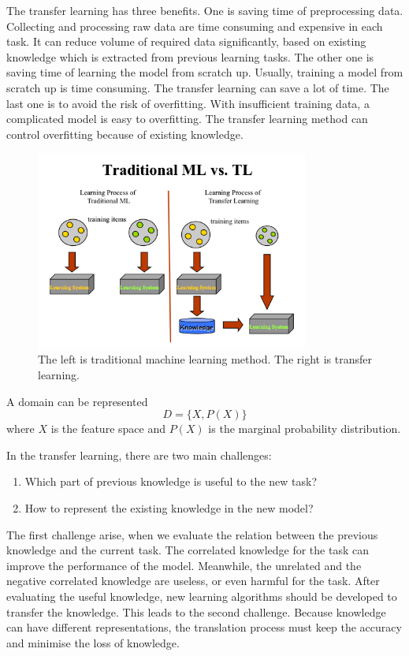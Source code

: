 The transfer learning has three benefits. One is saving time of preprocessing data. Collecting and processing raw data are time consuming and expensive in each task. It can reduce volume of required data significantly, based on existing knowledge which is extracted from previous learning tasks. The other one is saving time of learning the model from scratch up. Usually, training a model from scratch up is time consuming. The transfer learning can save a lot of time. The last one is to avoid the risk of overfitting. With insufficient training data, a complicated model is easy to overfitting. The transfer learning method can control overfitting because of existing knowledge.

\graphicspath{ {./Figures/} }
\begin{figure}[!htb]
\centering
\includegraphics[width=0.8\textwidth]{MLvsTL.png}
\caption{\label{fig:TransferLearning}The left is traditional machine learning method. The right is transfer learning.}
\end{figure}

A domain can be represented
\begin{equation}\label{eq:TransLearning}
D = \{ X, P(X) \}
\end{equation}
where $X$ is the feature space and $P(X)$ is the marginal probability distribution. 

In the transfer learning, there are two main challenges: 
\begin{enumerate}
  \item Which part of previous knowledge is useful to the new task?
  \item How to represent the existing knowledge in the new model?
\end{enumerate}
The first challenge arise, when we evaluate the relation between the previous knowledge and the current task. The correlated knowledge for the task can improve the performance of the model. Meanwhile, the unrelated and the negative correlated knowledge are useless, or even harmful for the task. After evaluating the useful knowledge, new learning algorithms should be developed to transfer the knowledge. This leads to the second challenge. Because knowledge can have different representations, the translation process must keep the accuracy and minimise the loss of knowledge. 